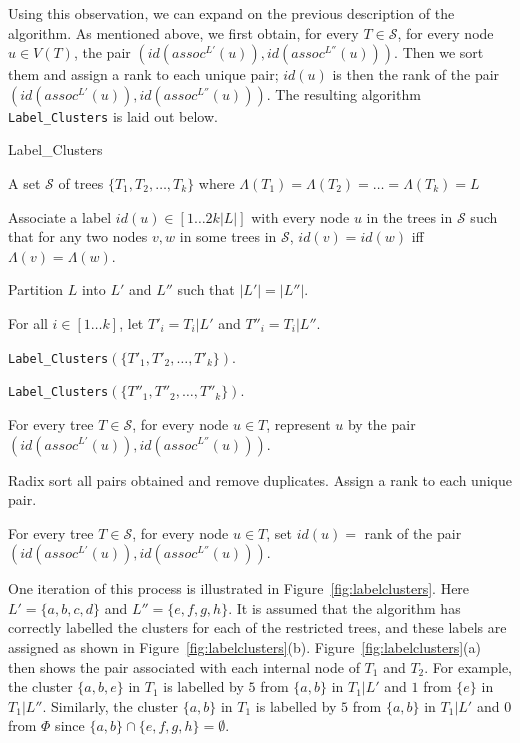 \documentclass[12pt,a4paper]{article}
\newcommand{\leafset}{\Lambda}
\begin{document}
    Using this observation, we can expand on the previous description of the algorithm. As mentioned above, we first obtain, for every $T \in \mathcal{S}$, for every node $u \in V(T)$, the pair $(id(assoc^{L'}(u)), id(assoc^{L''}(u)))$. Then we sort them and assign a rank to each unique pair; $id(u)$ is then the rank of the pair $(id(assoc^{L'}(u)), id(assoc^{L''}(u)))$. The resulting algorithm \texttt{Label\_Clusters} is laid out below.

    \begin{algorithm}
        \caption{Label\_Clusters}
        \label{alg:labelclusters}

        \begin{algorithmic}[1]
            \Input A set $\mathcal{S}$ of trees $\{T_1, T_2, \dots, T_k\}$ where $\leafset(T_1) = \leafset(T_2) = \dots = \leafset(T_k) = L$

            \Output Associate a label $id(u) \in [1 \dots 2k |L|]$ with every node $u$ in the trees in $\mathcal{S}$ such that for any two nodes $v, w$ in some trees in $\mathcal{S}$, $id(v) = id(w)$ iff $\leafset(v) = \leafset(w)$.

            \State Partition $L$ into $L'$ and $L''$ such that $|L'| = |L''|$.

            \State For all $i \in [1 \dots k]$, let $T'_i = T_i|L'$ and $T''_i = T_i|L''$.

            \State \texttt{Label\_Clusters}$(\{T'_1, T'_2, \dots, T'_k\})$.

            \State \texttt{Label\_Clusters}$(\{T''_1, T''_2, \dots, T''_k\})$.

            \State For every tree $T \in \mathcal{S}$, for every node $u \in T$, represent $u$ by the pair $(id(assoc^{L'}(u)), id(assoc^{L''}(u)))$.

            \State Radix sort all pairs obtained and remove duplicates. Assign a rank to each unique pair.

            \State For every tree $T \in \mathcal{S}$, for every node $u \in T$, set $id(u) = $ rank of the pair $(id(assoc^{L'}(u)), id(assoc^{L''}(u)))$.
        \end{algorithmic}
    \end{algorithm}

    One iteration of this process is illustrated in Figure~\ref{fig:labelclusters}. Here $L' = \{a, b, c, d\}$ and $L'' = \{e, f, g, h\}$. It is assumed that the algorithm has correctly labelled the clusters for each of the restricted trees, and these labels are assigned as shown in Figure~\ref{fig:labelclusters}(b). Figure~\ref{fig:labelclusters}(a) then shows the pair associated with each internal node of $T_1$ and $T_2$. For example, the cluster $\{a, b, e\}$ in $T_1$ is labelled by $5$ from $\{a, b\}$ in $T_1|L'$ and $1$ from $\{e\}$ in $T_1|L''$. Similarly, the cluster $\{a, b\}$ in $T_1$ is labelled by $5$ from $\{a, b\}$ in $T_1|L'$ and $0$ from $\Phi$ since $\{a, b\} \cap \{e, f, g, h\} = \emptyset$.
\end{document}
